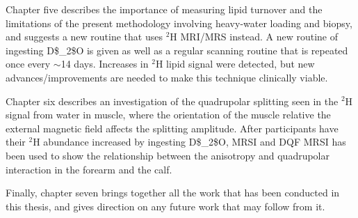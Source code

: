 Chapter five describes the importance of measuring lipid turnover and the limitations of the present methodology involving heavy-water loading and biopsy, and suggests a new routine that uses $^2$H \ac{MRI}/\ac{MRS} instead. A new routine of ingesting \ac{D$_2$O} is given as well as a regular scanning routine that is repeated once every $\sim$14 days. Increases in $^2$H lipid signal were detected, but new advances/improvements are needed to make this technique clinically viable.

Chapter six describes an investigation of the quadrupolar splitting seen in the $^2$H signal from water in muscle, where the orientation of the muscle relative the external magnetic field affects the splitting amplitude. After participants have their $^2$H abundance increased by ingesting \ac{D$_2$O}, \ac{MRSI} and \ac{DQF} \ac{MRSI} has been used to show the relationship between the anisotropy and quadrupolar interaction in the forearm and the calf.

Finally, chapter seven brings together all the work that has been conducted in this thesis, and gives direction on any future work that may follow from it.